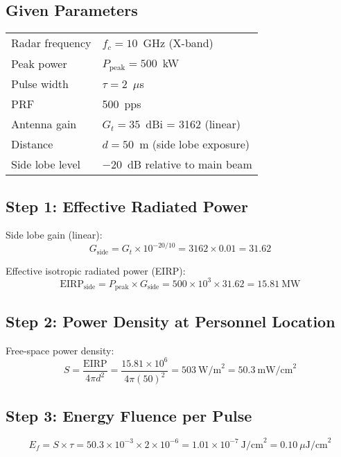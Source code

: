 \subsection*{Given Parameters}

\begin{tabular}{@{}ll@{}}
Radar frequency & $f_c = 10$~GHz (X-band) \\
Peak power & $P_{\text{peak}} = 500$~kW \\
Pulse width & $\tau = 2$~$\mu$s \\
PRF & 500~pps \\
Antenna gain & $G_t = 35$~dBi = 3162 (linear) \\
Distance & $d = 50$~m (side lobe exposure) \\
Side lobe level & $-20$~dB relative to main beam \\
\end{tabular}

\subsection*{Step 1: Effective Radiated Power}

Side lobe gain (linear):
\begin{equation}
G_{\text{side}} = G_t \times 10^{-20/10} = 3162 \times 0.01 = 31.62
\end{equation}

Effective isotropic radiated power (EIRP):
\begin{equation}
\text{EIRP}_{\text{side}} = P_{\text{peak}} \times G_{\text{side}} = 500 \times 10^3 \times 31.62 = 15.81~\text{MW}
\end{equation}

\subsection*{Step 2: Power Density at Personnel Location}

Free-space power density:
\begin{equation}
S = \frac{\text{EIRP}}{4\pi d^2} = \frac{15.81 \times 10^6}{4\pi (50)^2} = 503~\text{W/m}^2 = 50.3~\text{mW/cm}^2
\end{equation}

\subsection*{Step 3: Energy Fluence per Pulse}

\begin{equation}
E_f = S \times \tau = 50.3 \times 10^{-3} \times 2 \times 10^{-6} = 1.01 \times 10^{-7}~\text{J/cm}^2 = 0.10~\mu\text{J/cm}^2
\end{equation}

